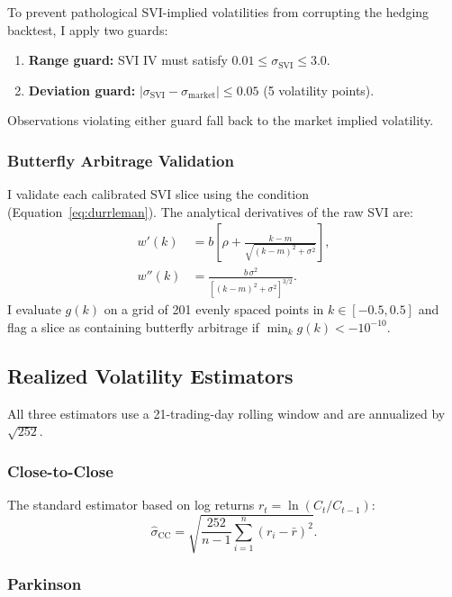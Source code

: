 \documentclass[12pt, letterpaper]{article}
\begin{document}
To prevent pathological SVI-implied volatilities from corrupting the hedging backtest, I apply two guards:
\begin{enumerate}
    \item \textbf{Range guard:} SVI IV must satisfy $0.01 \leq \sigma_{\text{SVI}} \leq 3.0$.
    \item \textbf{Deviation guard:} $|\sigma_{\text{SVI}} - \sigma_{\text{market}}| \leq 0.05$ (5 volatility points).
\end{enumerate}
Observations violating either guard fall back to the market implied volatility.

\subsubsection{Butterfly Arbitrage Validation}

I validate each calibrated SVI slice using the \citet{Durrleman2005} condition (Equation~\ref{eq:durrleman}). The analytical derivatives of the raw SVI are:
\begin{align}
    w'(k) &= b\left[\rho + \frac{k - m}{\sqrt{(k - m)^2 + \sigma^2}}\right], \label{eq:svi_wprime} \\
    w''(k) &= \frac{b\, \sigma^2}{\left[(k - m)^2 + \sigma^2\right]^{3/2}}. \label{eq:svi_wdoubleprime}
\end{align}
I evaluate $g(k)$ on a grid of 201 evenly spaced points in $k \in [-0.5, 0.5]$ and flag a slice as containing butterfly arbitrage if $\min_k g(k) < -10^{-10}$.

\subsection{Realized Volatility Estimators}
\label{sec:rv_estimators}

All three estimators use a 21-trading-day rolling window and are annualized by $\sqrt{252}$.

\subsubsection{Close-to-Close}

The standard estimator based on log returns $r_t = \ln(C_t / C_{t-1})$:
\begin{equation}
    \hat{\sigma}_{\text{CC}} = \sqrt{\frac{252}{n-1} \sum_{i=1}^{n} (r_i - \bar{r})^2}.
    \label{eq:rv_cc}
\end{equation}

\subsubsection{Parkinson}
\end{document}
